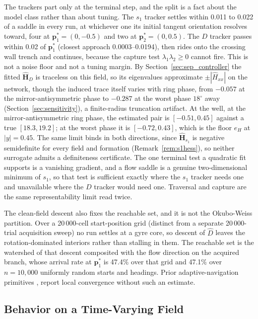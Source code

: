 \documentclass[lettersize,journal]{IEEEtran}
\begin{document}
The trackers part only at the terminal step, and the split is a fact about
the model class rather than about tuning. The $s_1$ tracker settles within
0.011 to 0.022 of a saddle in every run, at whichever one its initial
tangent orientation resolves toward, four at $\mathbf{p}^*_1 = (0, -0.5)$
and two at $\mathbf{p}^*_2 = (0, 0.5)$. The $D$ tracker passes within 0.02
of $\mathbf{p}^*_1$ (closest approach 0.0003--0.0194), then rides onto the
crossing wall trench and continues, because the capture test
$\lambda_1\lambda_2 \geq 0$ cannot fire. This is not a noise floor and not
a tuning margin. By Section~\ref{sec:sep_controller} the
fitted $\hat{\mathbf{H}}_D$ is traceless on this field, so its
eigenvalues approximate $\pm|\hat{H}_{xx}|$ on the network, though the
induced trace itself varies with ring phase, from $-0.057$ at the
mirror-antisymmetric phase to $-0.287$ at the worst phase $18^\circ$ away
(Section~\ref{sec:sensitivity}), a finite-radius truncation artifact. At
the well, at the mirror-antisymmetric ring phase, the estimated pair is
$[-0.51, 0.45]$ against a true $[18.3, 19.2]$; at the worst phase it is
$[-0.72, 0.43]$, which is the floor $e_H$ at $|y| = 0.45$. The same limit binds in
both directions, since $\hat{\mathbf{H}}_{s_1}$ is negative semidefinite
for every field and formation (Remark~\ref{rem:s1hess}), so neither
surrogate admits a definiteness certificate. The one terminal test a
quadratic fit supports is a vanishing gradient, and a flow saddle is a
genuine two-dimensional minimum of $s_1$, so that test is sufficient
exactly where the $s_1$ tracker needs one and unavailable where the $D$
tracker would need one. Traversal and capture are the same
representability limit read twice.

The clean-field descent also fixes the reachable set, and it is not the
Okubo-Weiss partition. Over a 20\,000-cell start-position grid (distinct
from a separate 20\,000-trial acquisition sweep) no
run settles at a
gyre core, so descent of $\hat{D}$ leaves the rotation-dominated
interiors rather than stalling in them. The reachable set is the
watershed of that descent composited with the flow direction on the
acquired branch, whose arrival rate at $\mathbf{p}^*_1$ is 47.4\% over
that grid and 47.1\% over $n = 10{,}000$ uniformly random starts and
headings. Prior adaptive-navigation primitives \cite{3}, \cite{4} report
local convergence without such an estimate.

\subsection{Behavior on a Time-Varying Field}
\label{sec:time_varying}
\end{document}

